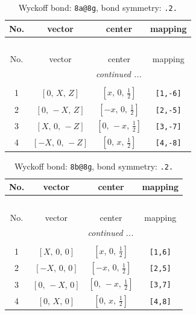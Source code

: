 \documentclass[fleqn,8pt]{jsarticle}
\begin{document}
\begin{longtable}{cccc}
\caption{Wyckoff bond: {\tt 8a@8g}, bond symmetry: {\tt .2.}}
 \\
 \hline \hline
No. & vector & center & mapping \\ \hline \endfirsthead

\multicolumn{3}{l}{\tablename\ \thetable{}} \\
 \hline \hline
No. & vector & center & mapping \\ \hline \endhead

 \hline \hline
\multicolumn{3}{r}{\footnotesize\it continued ...} \\ \endfoot

 \hline \hline
\multicolumn{3}{r}{} \\ \endlastfoot

1 & $\left[ 0,\, X,\, Z \right]$ & $\left[ x,\, 0,\, \frac{1}{2} \right]$ & {\tt [1,-6]} \\ \hline
2 & $\left[ 0,\, - X,\, Z \right]$ & $\left[ - x,\, 0,\, \frac{1}{2} \right]$ & {\tt [2,-5]} \\ \hline
3 & $\left[ X,\, 0,\, - Z \right]$ & $\left[ 0,\, - x,\, \frac{1}{2} \right]$ & {\tt [3,-7]} \\ \hline
4 & $\left[ - X,\, 0,\, - Z \right]$ & $\left[ 0,\, x,\, \frac{1}{2} \right]$ & {\tt [4,-8]} \\
\end{longtable}
\renewcommand{\arraystretch}{1.2}
\begin{longtable}{cccc}
\caption{Wyckoff bond: {\tt 8b@8g}, bond symmetry: {\tt .2.}}
 \\
 \hline \hline
No. & vector & center & mapping \\ \hline \endfirsthead

\multicolumn{3}{l}{\tablename\ \thetable{}} \\
 \hline \hline
No. & vector & center & mapping \\ \hline \endhead

 \hline \hline
\multicolumn{3}{r}{\footnotesize\it continued ...} \\ \endfoot

 \hline \hline
\multicolumn{3}{r}{} \\ \endlastfoot

1 & $\left[ X,\, 0,\, 0 \right]$ & $\left[ x,\, 0,\, \frac{1}{2} \right]$ & {\tt [1,6]} \\ \hline
2 & $\left[ - X,\, 0,\, 0 \right]$ & $\left[ - x,\, 0,\, \frac{1}{2} \right]$ & {\tt [2,5]} \\ \hline
3 & $\left[ 0,\, - X,\, 0 \right]$ & $\left[ 0,\, - x,\, \frac{1}{2} \right]$ & {\tt [3,7]} \\ \hline
4 & $\left[ 0,\, X,\, 0 \right]$ & $\left[ 0,\, x,\, \frac{1}{2} \right]$ & {\tt [4,8]} \\
\end{longtable}
\end{document}
